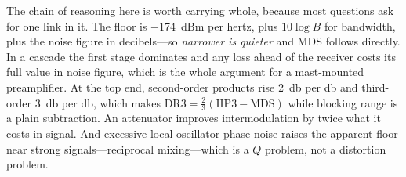 \begin{exambox}
The chain of reasoning here is worth carrying whole, because most questions ask for one
link in it. The floor is \SI{-174}{dBm} per hertz, plus \(10\log B\) for bandwidth,
plus the noise figure in decibels---so \emph{narrower is quieter} and MDS follows
directly. In a cascade the first stage dominates and any loss ahead of the receiver
costs its full value in noise figure, which is the whole argument for a mast-mounted
preamplifier. At the top end, second-order products rise \SI{2}{\decibel} per
\si{\decibel} and third-order \SI{3}{\decibel} per \si{\decibel}, which makes
\(\mathrm{DR3}=\tfrac23(\mathrm{IIP3}-\mathrm{MDS})\) while blocking range is a plain
subtraction. An attenuator improves intermodulation by twice what it costs in signal.
And excessive local-oscillator phase noise raises the apparent floor near strong
signals---reciprocal mixing---which is a \(Q\) problem, not a distortion problem.
\end{exambox}

